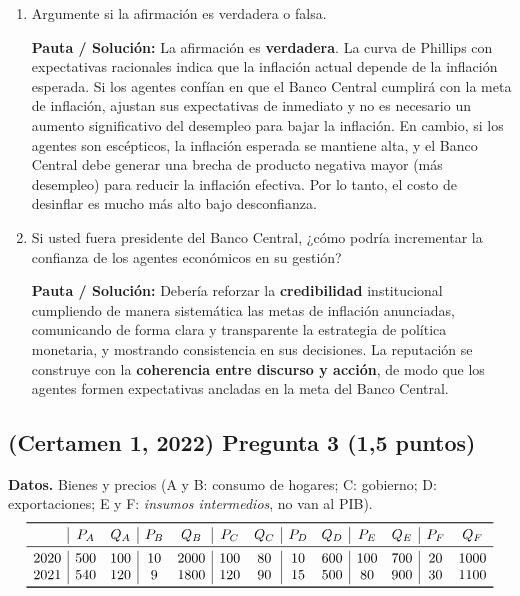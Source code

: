 \documentclass[11pt,addpoints]{article}
\begin{document}
\begin{enumerate}[label=\alph*)]
\item Argumente si la afirmación es verdadera o falsa.  

\textbf{Pauta / Solución:}  
La afirmación es \textbf{verdadera}.  
La curva de Phillips con expectativas racionales indica que la inflación actual depende de la inflación esperada. Si los agentes confían en que el Banco Central cumplirá con la meta de inflación, ajustan sus expectativas de inmediato y no es necesario un aumento significativo del desempleo para bajar la inflación.  
En cambio, si los agentes son escépticos, la inflación esperada se mantiene alta, y el Banco Central debe generar una brecha de producto negativa mayor (más desempleo) para reducir la inflación efectiva. Por lo tanto, el costo de desinflar es mucho más alto bajo desconfianza.


\newpage
\vspace*{0.1cm}

\item Si usted fuera presidente del Banco Central, ¿cómo podría incrementar la confianza de los agentes económicos en su gestión?  

\textbf{Pauta / Solución:}  
Debería reforzar la \textbf{credibilidad} institucional cumpliendo de manera sistemática las metas de inflación anunciadas, comunicando de forma clara y transparente la estrategia de política monetaria, y mostrando consistencia en sus decisiones.  
La reputación se construye con la \textbf{coherencia entre discurso y acción}, de modo que los agentes formen expectativas ancladas en la meta del Banco Central.
\end{enumerate}
\subsection*{(Certamen 1, 2022) \quad Pregunta 3 (1,5 puntos)}

\textbf{Datos.} Bienes y precios (A y B: consumo de hogares; C: gobierno; D: exportaciones; E y F: \emph{insumos intermedios}, no van al PIB).
\[
\begin{array}{c|cc|cc|cc|cc|cc|cc}
\toprule
 & P_A & Q_A & P_B & Q_B & P_C & Q_C & P_D & Q_D & P_E & Q_E & P_F & Q_F\\
\midrule
2020 & 500 & 100 & 10 & 2000 & 100 & 80 & 10 & 600 & 100 & 700 & 20 & 1000\\
2021 & 540 & 120 & 9 & 1800 & 120 & 90 & 15 & 500 & 80 & 900 & 30 & 1100\\
\bottomrule
\end{array}
\]
\end{document}
